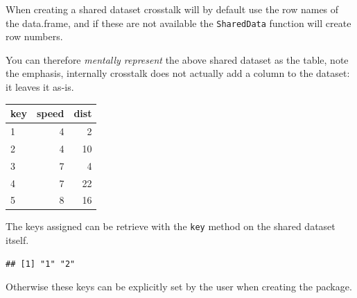 \documentclass[
]{krantz}
\makeatletter
\newenvironment{Shaded}{\begin{snugshade}}{\end{snugshade}}
\newcommand{\CommentTok}[1]{\textcolor[rgb]{0.37,0.37,0.37}{\textit{#1}}}
\newcommand{\DataTypeTok}[1]{\textcolor[rgb]{0.27,0.27,0.27}{#1}}
\newcommand{\DecValTok}[1]{\textcolor[rgb]{0.06,0.06,0.06}{#1}}
\newcommand{\KeywordTok}[1]{\textcolor[rgb]{0.27,0.27,0.27}{\textbf{#1}}}
\newcommand{\NormalTok}[1]{#1}
\newcommand{\OperatorTok}[1]{\textcolor[rgb]{0.43,0.43,0.43}{\textbf{#1}}}
\newcommand{\StringTok}[1]{\textcolor[rgb]{0.5,0.5,0.5}{#1}}
\newenvironment{kframe}{%
\medskip{}
\setlength{\fboxsep}{.8em}
 \def\at@end@of@kframe{}%
 \ifinner\ifhmode%
  \def\at@end@of@kframe{\end{minipage}}%
  \begin{minipage}{\columnwidth}%
 \fi\fi%
 \def\FrameCommand##1{\hskip\@totalleftmargin \hskip-\fboxsep
 \colorbox{shadecolor}{##1}\hskip-\fboxsep
     \hskip-\linewidth \hskip-\@totalleftmargin \hskip\columnwidth}%
 \MakeFramed {\advance\hsize-\width
   \@totalleftmargin\z@ \linewidth\hsize
   \@setminipage}}%
 {\par\unskip\endMakeFramed%
 \at@end@of@kframe}
\renewenvironment{Shaded}{\begin{kframe}}{\end{kframe}}
\makeatother
\begin{document}
When creating a shared dataset crosstalk will by default use the row names of the data.frame, and if these are not available the \texttt{SharedData} function will create row numbers.

\begin{Shaded}
\end{Shaded}

You can therefore \emph{mentally represent} the above shared dataset as the table, note the emphasis, internally crosstalk does not actually add a column to the dataset: it leaves it as-is.

\begin{tabular}{l|r|r}
\hline
key & speed & dist\\
\hline
1 & 4 & 2\\
\hline
2 & 4 & 10\\
\hline
3 & 7 & 4\\
\hline
4 & 7 & 22\\
\hline
5 & 8 & 16\\
\hline
\end{tabular}

The keys assigned can be retrieve with the \texttt{key} method on the shared dataset itself.

\begin{Shaded}
\end{Shaded}

\begin{verbatim}
## [1] "1" "2"
\end{verbatim}

Otherwise these keys can be explicitly set by the user when creating the package.

\begin{Shaded}
\end{Shaded}
\end{document}

